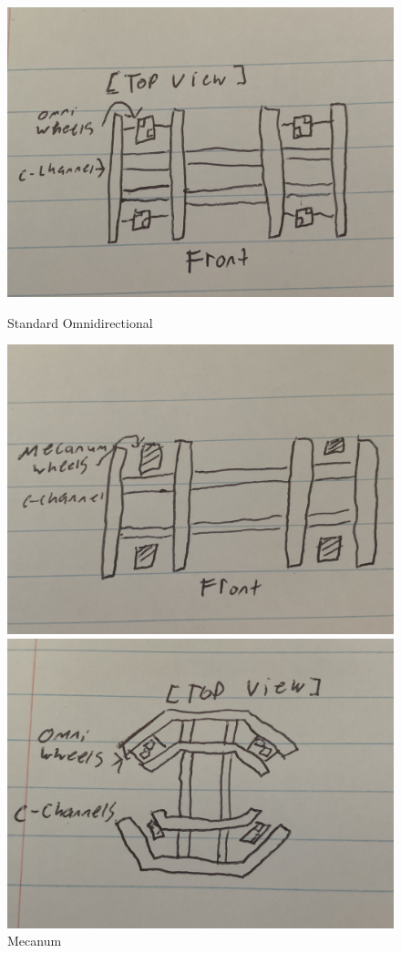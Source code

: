 \begin{figure}[hbt!] %
    \begin{minipage}{.5\textwidth}
        \centering
        \includegraphics[width=.8\linewidth]{images/Omni Drive.jpg}
        \caption{Standard Omnidirectional} %
        \label{fig:standard-omnidirectional-wheels}
    \end{minipage}%
    \begin{minipage}{.5\textwidth}
        \centering
        \includegraphics[width=.8\linewidth]{images/Mecanum Drive.jpg}
        \caption{Mecanum}
        \label{fig:mecanum}
    \end{minipage}
    \begin{minipage}{.5\textwidth}
        \centering
        \includegraphics[width=.8\linewidth]{images/Hexagonal Omni Wheels.jpg}

\end{minipage}
\end{figure}
